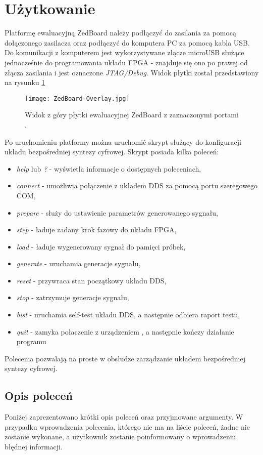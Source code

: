 \section{Użytkowanie}
    Platformę ewaluacyjną ZedBoard należy podłączyć do zasilania za pomocą dołączonego zasilacza oraz 
    podłączyć do komputera PC za pomocą kabla USB. Do komunikacji z komputerem jest wykorzystywane złącze 
    microUSB służące jednocześnie do programowania układu FPGA - znajduje się ono po prawej od złącza zasilania
    i jest oznaczone \textit{JTAG/Debug}. Widok płytki został przedstawiony na rysunku \ref{fig:ZedBoard_top}
    \begin{figure}[!ht]
        \centering
        \texttt{[image: ZedBoard-Overlay.jpg]}
        \caption{Widok z góry płytki ewaluacyjnej ZedBoard z zaznaczonymi portami \cite{ZedBoard}.}
        \label{fig:ZedBoard_top}
    \end{figure}
    Po uruchomieniu platformy można uruchomić skrypt służący do konfiguracji układu bezpośredniej syntezy cyfrowej. 
    Skrypt posiada kilka poleceń: 
    \begin{itemize}
        \item \textit{help} lub \textit{?} - wyświetla informacje o dostępnych poleceniach,
        \item \textit{connect} - umożliwia połączenie z układem DDS za pomocą portu szeregowego COM,
        \item \textit{prepare} - służy do ustawienie parametrów generowanego sygnału,
        \item \textit{step} - ładuje zadany krok fazowy do układu FPGA,
        \item \textit{load} - ładuje wygenerowany sygnał do pamięci próbek,
        \item \textit{generate} - uruchamia generacje sygnału,
        \item \textit{reset} - przywraca stan początkowy układu DDS,
        \item \textit{stop} - zatrzymuje generacje sygnału, 
        \item \textit{bist} - uruchamia self-test układu DDS, a następnie odbiera raport testu, 
        \item \textit{quit} - zamyka połaczenie z urządzeniem , a następnie kończy działanie programu
    \end{itemize}
    Polecenia pozwalają na proste w obsłudze zarządzanie układem bezpośredniej syntezy cyfrowej. 
    \subsection{Opis poleceń}
        Poniżej zaprezentowano krótki opis poleceń oraz przyjmowane argumenty. W przypadku wprowadzenia polecenia, którego nie 
        ma na liście poleceń, żadne nie zostanie wykonane, a użytkownik zostanie poinformowany o wprowadzeniu błędnej informacji. 
